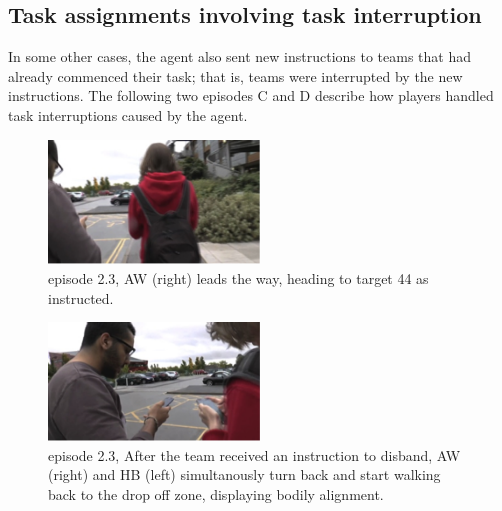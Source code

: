 \subsection{Task assignments involving task interruption}
In some other cases, the agent also sent new instructions to teams that had already commenced their task; that is, teams were interrupted by the new instructions. The following two episodes C and D describe how players handled task interruptions caused by the agent.\\

\begin{figure}[ht]
\centering
\includegraphics[width=0.5\textwidth]{img/study2/ep3/ep31}
\caption{episode 2.3, AW (right) leads the way, heading to target 44 as instructed.}
\label{fig:study2ep31}
\end{figure}

\begin{figure}[ht]
\centering
\includegraphics[width=0.5\textwidth]{img/study2/ep3/ep32}
\caption{episode 2.3, After the team received an instruction to disband, AW (right) and HB (left) simultanously turn back and start walking back to the drop off zone, displaying bodily alignment.}
\label{fig:study2ep32}

\end{figure}

